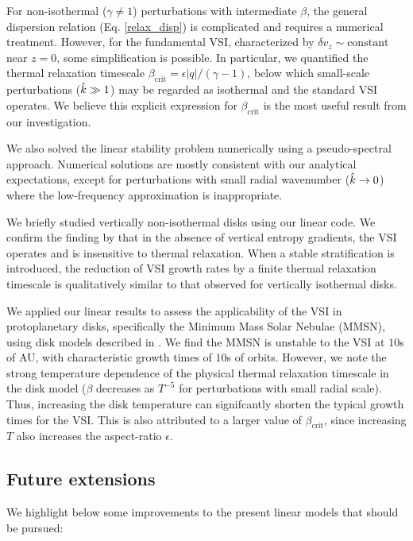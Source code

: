 For non-isothermal ($\gamma\neq1$) perturbations with intermediate
$\beta$, the general dispersion relation
(Eq. \ref{relax_disp}) is complicated and requires a numerical
treatment. However, for the fundamental VSI, characterized by  $\delta
v_z\sim\mathrm{constant}$ near $z=0$, some simplification is
possible. In particular, we quantified the thermal relaxation
timescale $\beta_\mathrm{crit}=\epsilon|q|/(\gamma-1)$, below
which small-scale perturbations ($\hat{k}\gg 1$) may be regarded as isothermal
and the standard VSI operates. We believe this explicit expression for
$\beta_\mathrm{crit}$ is the most useful result from our
investigation. 

We also solved the linear stability problem numerically using a
pseudo-spectral approach. Numerical solutions are mostly consistent
with our analytical expectations, except for perturbations with small
radial wavenumber ($\hat{k}\to0$) where the low-frequency approximation
is inappropriate.  

We briefly studied vertically non-isothermal disks using our linear
code. We confirm the finding by \cite{nelson13} that in the absence
of vertical entropy gradients, the VSI operates and is insensitive to thermal relaxation. When a
stable stratification is introduced, the reduction of VSI growth
rates by a finite thermal relaxation timescale is qualitatively similar to
that observed for vertically isothermal disks. 


We applied our linear results to assess the applicability of the VSI in
protoplanetary disks, specifically the Minimum Mass Solar Nebulae (MMSN),
using disk models described in \cite{chiang10}. We find the MMSN is
unstable to the VSI at $10$s of AU, with characteristic
growth times of $10$s of orbits. However, we note the strong
temperature dependence of the physical thermal relaxation timescale
in the disk model ($\beta$ decreases as $T^{-5}$ for perturbations with small
radial scale). Thus, increasing the disk temperature can signifcantly 
shorten the typical growth times for the VSI. This is also attributed
to a larger value of $\beta_\mathrm{crit}$, since increasing $T$ also
increases the aspect-ratio $\epsilon$. 

\subsection{Future extensions} 
We highlight below some improvements to the present  
linear models that should be pursued:

